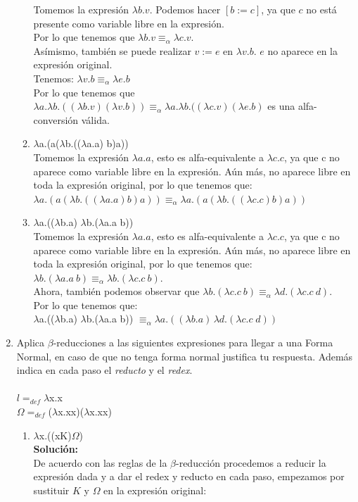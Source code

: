 \documentclass[11pt]{article}
\begin{document}
\begin{enumerate}[leftmargin=0.8cm]
\begin{enumerate}
        Tomemos la expresión $\lambda b.v$. Podemos hacer $[b:=c]$, ya que $c$ no está presente como variable libre en la expresión.\\
        Por lo que tenemos que $\lambda b.v \equiv_\alpha \lambda c.v$.\\
        Asímismo, también se puede realizar $v:= e$ en $\lambda v.b$. $e$ no aparece en la expresión original.\\
        Tenemos: $\lambda v.b \equiv_\alpha \lambda e.b$\\
        Por lo que tenemos que $\lambda a.\lambda b.((\lambda b.v) (\lambda v.b)) \equiv_\alpha \lambda a.\lambda b.((\lambda c.v) (\lambda e.b)$ es una alfa-conversión válida.
        
        \item $\lambda$a.(a($\lambda$b.(($\lambda$a.a) b)a))\\
        Tomemos la expresión $\lambda a.a$, esto es alfa-equivalente a $\lambda c.c$, ya que c no aparece como
        variable libre en la expresión. Aún más, no aparece libre en toda la expresión original, por lo que tenemos que:\\
        $\lambda a.(a(\lambda b.((\lambda a.a) b)a)) \equiv_\alpha \lambda a.(a(\lambda b.((\lambda c.c) b)a))$
        
        \item $\lambda$a.(($\lambda$b.a) $\lambda$b.($\lambda$a.a b))\\
        Tomemos la expresión $\lambda a.a$, esto es alfa-equivalente a $\lambda c.c$, ya que c no aparece como
        variable libre en la expresión. Aún más, no aparece libre en toda la expresión original, por lo que tenemos que:\\
        $\lambda b.(\lambda a.a\: b) \equiv_\alpha \lambda b.(\lambda c.c\: b)$.\\
        Ahora, también podemos observar que $\lambda b.(\lambda c.c\: b) \equiv_\alpha \lambda d.(\lambda c.c\: d)$.\\
        Por lo que tenemos que:\\
        $\lambda$a.(($\lambda$b.a) $\lambda$b.($\lambda$a.a b)) $\equiv_\alpha \lambda a.((\lambda b.a)\, \lambda d.(\lambda c.c \; d))$
    \end{enumerate}
    \item Aplica $\beta$-reducciones a las siguientes expresiones para llegar a una Forma Normal, en caso de que no tenga forma normal justifica tu respuesta. Además indica en cada paso el \textit{reducto} y el \textit{redex}.\\
    \\
    $l = _{def}\lambda$x.x\\
    $\Omega = _{def}$($\lambda$x.xx)($\lambda$x.xx)
    \begin{enumerate}
        \item $\lambda$x.((xK)$\Omega$)\\
        \textbf{Solución:}\\
        De acuerdo con las reglas de la $\beta$-reducción procedemos a reducir la expresión dada y a dar el redex y reducto en cada paso, empezamos por sustituir $K$ y $\Omega$ en la expresión original:


\end{enumerate}
\end{enumerate}
\end{document}
